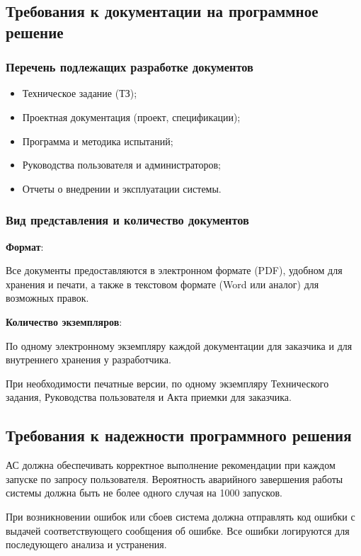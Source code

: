 \subsection{Требования к документации на программное решение}

\subsubsection{Перечень подлежащих разработке документов}

\begin{itemize}
	\item Техническое задание (ТЗ);
	\item Проектная документация (проект, спецификации);
	\item Программа и методика испытаний;
	\item Руководства пользователя и администраторов;
	\item Отчеты о внедрении и эксплуатации системы.
\end{itemize}

\subsubsection{Вид представления и количество документов}

\textbf{Формат}:

Все документы предоставляются в электронном формате (PDF),
удобном для хранения и печати,
а также в текстовом формате (Word или аналог) для возможных правок.

\textbf{Количество экземпляров}:

По одному электронному экземпляру каждой документации
для заказчика и для внутреннего хранения у разработчика.

При необходимости печатные версии, по одному экземпляру Технического задания,
Руководства пользователя и Акта приемки для заказчика.

\subsection{Требования к надежности программного решения}

АС должна обеспечивать корректное выполнение рекомендации
при каждом запуске по запросу пользователя.
Вероятность аварийного завершения работы системы должна быть
не более одного случая на 1000 запусков.

При возникновении ошибок или сбоев система должна отправлять код ошибки
с выдачей соответствующего сообщения об ошибке.
Все ошибки логируются для последующего анализа и устранения.

